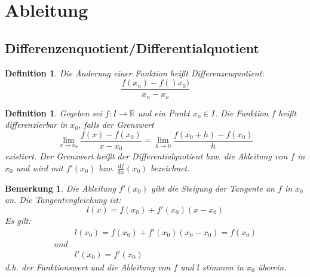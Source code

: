 \documentclass[12pt,a4paper]{article}%
\newtheorem{definition}[satz]{Definition}
\newtheorem{bem}{Bemerkung}[section]
\numberwithin{equation}{section}
\newcommand{\R}{\mathbb{R}} %
\def\diff#1#2{\frac{\mathrm{d}#1}{\mathrm{d}#2}}
\numberwithin{equation}{subsection}
\begin{document}
\section{Ableitung}
  \subsection{Differenzenquotient/Differentialquotient}
  \begin{definition}
    Die Änderung einer Funktion heißt Differenzenquotient:
    \begin{equation}
      \frac{f(x_n)-f()x_0)}{x_n - x_o}
    \end{equation}
  \end{definition}
  \begin{definition}
    Gegeben sei $f: I\rightarrow \R$ und ein Punkt $x_o \in I$. Die Funktion $f$ heißt differenzierbar in $x_0$, falls der Grenzwert
    \begin{equation}
      \lim_{x\rightarrow x_0} \frac{f(x) - f(x_0)}{x - x_0} = \lim_{h \rightarrow 0} \frac{f(x_0 + h) - f(x_0)}{h}
    \end{equation}
    existiert. Der Grenzwert heißt der Differentialquotient bzw. die Ableitung von $f$ in $x_0$ und wird mit $f'(x_0)$ bzw. $\diff{f}{x}(x_0)$ bezeichnet.
  \end{definition}
  \begin{bem}
    Die Ableitung $f'(x_0)$ gibt die Steigung der Tangente an $f$ in $x_0$ an. Die Tangentengleichung ist:
    \begin{equation}
      l(x) = f(x_0) + f'(x_0)(x-x_0)
    \end{equation}
    Es gilt:
    \begin{align}
      &l(x_0) = f(x_0) + f'(x_0)(x_0 - x_0) = f(x_0) \\
      und\nonumber \\
      &l'(x_0) = f'(x_0)
    \end{align}
    d.h. der Funktionswert und die Ableitung von $f$ und $l$ stimmen in $x_0$ überein.
  \end{bem}
\end{document}
